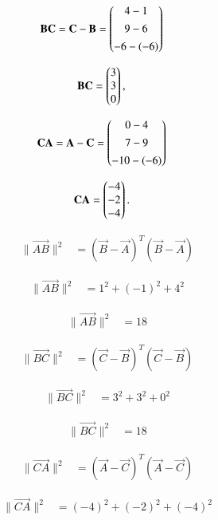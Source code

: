 \documentclass[journal]{IEEEtran}
\begin{document}
\begin{align}
\mathbf{BC} &= \mathbf{C}-\mathbf{B} = \begin{pmatrix}4-1\\[4pt]9-6\\[4pt]-6-(-6)\end{pmatrix}
\end{align}

\begin{align}
\mathbf{BC} &= \begin{pmatrix}3\\3\\0\end{pmatrix},
\end{align}

\begin{align}
\mathbf{CA} &= \mathbf{A}-\mathbf{C} = \begin{pmatrix}0-4\\[4pt]7-9\\[4pt]-10-(-6)\end{pmatrix}
\end{align}

\begin{align}
\mathbf{CA} &= \begin{pmatrix}-4\\-2\\-4\end{pmatrix}.
\end{align}


\begin{align}
\|\vec{AB}\|^2 &= (\vec{B}-\vec{A})^T(\vec{B}-\vec{A})
\end{align}

\begin{align}
\|\vec{AB}\|^2 &= 1^2 + (-1)^2 + 4^2
\end{align}

\begin{align}
\|\vec{AB}\|^2 &= 18
\end{align}

\begin{align}
\|\vec{BC}\|^2 &= (\vec{C}-\vec{B})^T(\vec{C}-\vec{B})
\end{align}

\begin{align}
\|\vec{BC}\|^2 &= 3^2 + 3^2 + 0^2
\end{align}

\begin{align}
\|\vec{BC}\|^2 &= 18
\end{align}

\begin{align}
\|\vec{CA}\|^2 &= (\vec{A}-\vec{C})^T(\vec{A}-\vec{C})
\end{align}

\begin{align}
\|\vec{CA}\|^2 &= (-4)^2 + (-2)^2 + (-4)^2
\end{align}
\end{document}
